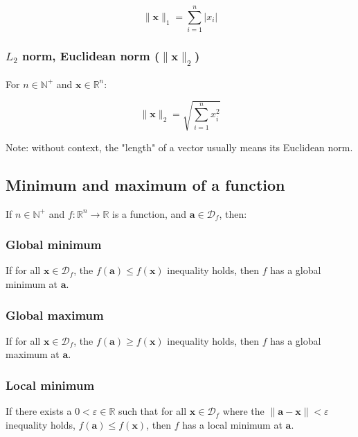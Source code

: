 \documentclass[titlepage]{article}
\begin{document}
          $$\| \mathbf{x} \|_1 = \sum_{i=1}^n \left\lvert x_i \right\rvert$$

        \subsubsection{$L_2$ norm, Euclidean norm ($\| \mathbf{x} \|_2$)}

          For $n \in \mathbb{N}^+$ and $\mathbf{x} \in \mathbb{R}^n$:

          $$\| \mathbf{x} \|_2 = \sqrt{ \sum_{i=1}^n x_i^2 }$$

          Note: without context, the "length" of a vector usually means its
          Euclidean norm.

      \subsection{Minimum and maximum of a function}

        If $n \in \mathbb{N}^+$ and $f : \mathbb{R}^n \rightarrow \mathbb{R}$ is
        a function, and $\mathbf{a} \in \mathcal{D}_f$, then:

        \subsubsection{Global minimum}

          If for all $\mathbf{x} \in \mathcal{D}_f$, the
          $f(\mathbf{a}) \leq f(\mathbf{x})$ inequality holds, then $f$ has a
          global minimum at $\mathbf{a}$.

        \subsubsection{Global maximum}

          If for all $\mathbf{x} \in \mathcal{D}_f$, the
          $f(\mathbf{a}) \geq f(\mathbf{x})$ inequality holds, then $f$ has a
          global maximum at $\mathbf{a}$.

        \subsubsection{Local minimum}

          If there exists a $0 < \varepsilon \in \mathbb{R}$ such that for all
          $\mathbf{x} \in \mathcal{D}_f$ where the
          $\| \mathbf{a} - \mathbf{x} \| < \varepsilon$ inequality holds,
          $f(\mathbf{a}) \leq f(\mathbf{x})$, then $f$ has a local minimum at
          $\mathbf{a}$.
\end{document}
